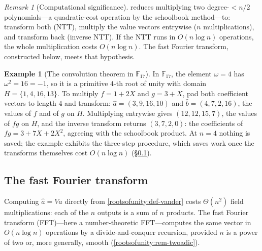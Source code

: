 \documentclass[11pt,a4paper]{article}
\theoremstyle{definition}
\newtheorem{example}[theorem]{Example}
\theoremstyle{remark}
\newtheorem{remark}[theorem]{Remark}
\newcommand{\F}{\ensuremath{\mathbb{F}}}
\begin{document}
\begin{remark}[Computational significance]\label{rootsofunity:rem-whyntt}
 reduces multiplying two
degree-\(<n/2\) polynomials---a quadratic-cost operation by the
schoolbook method---to: transform both (NTT), multiply the value
vectors entrywise (\(n\) multiplications), and transform back (inverse
NTT). If the NTT runs in \(O(n \log n)\) operations, the whole
multiplication costs \(O(n \log n)\). The fast Fourier transform,
constructed below, meets that hypothesis.
\end{remark}

\begin{example}[The convolution theorem in \(\F_{17}\)]
\label{rootsofunity:exp-ntt17}
In \(\F_{17}\), the element \(\omega = 4\) has
\(\omega^2 = 16 = -1\), so it is a primitive \(4\)-th root of unity
with domain \(H = \{1, 4, 16, 13\}\). To multiply \(f = 1 + 2X\)
and \(g = 3 + X\), pad both coefficient vectors to length \(4\) and
transform: \(\hat{a} = (3, 9, 16, 10)\) and
\(\hat{b} = (4, 7, 2, 16)\), the values of \(f\) and of \(g\) on
\(H\). Multiplying entrywise gives \((12, 12, 15, 7)\), the values
of \(fg\) on \(H\), and the inverse transform returns
\((3, 7, 2, 0)\): the coefficients of \(fg = 3 + 7X + 2X^2\),
agreeing with the schoolbook product. At \(n = 4\) nothing is saved;
the example exhibits the three-step procedure, which saves work once the
transforms themselves cost \(O(n \log n)\)
(\S\ref{rootsofunity:sub-fft}).
\end{example}

\subsection{The fast Fourier transform}\label{rootsofunity:sub-fft}

Computing \(\hat{a} = Va\) directly from
\cref{rootsofunity:def-vander} costs \(\Theta(n^2)\) field
multiplications: each of the \(n\) outputs is a sum of \(n\) products.
The fast Fourier transform (FFT)---here a number-theoretic
FFT---computes the same vector in \(O(n \log n)\) operations by a
divide-and-conquer recursion, provided \(n\) is a power of two or, more
generally, smooth (\cref{rootsofunity:rem-twoadic}).
\end{document}
